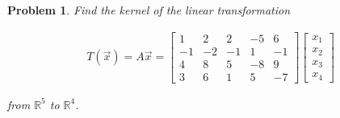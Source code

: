 \documentclass{article}
\newtheorem{problem}{Problem}
\begin{document}
\begin{problem}
Find the kernel of the linear transformation 

\begin{align*}
T(\vec{x}) = A\vec{x} =
\begin{bmatrix}
1 & 2 & 2 & -5 & 6 \\ 
-1 & -2 & -1 & 1 & -1 \\
4 & 8 & 5 & -8 & 9 \\ 
3 & 6 & 1 & 5 & -7 
\end{bmatrix} \begin{bmatrix} x_{1} \\ x_{2} \\ x_{3} \\ x_{4} \end{bmatrix}
\end{align*}

from $\mathbb{R}^5$ to $\mathbb{R}^4$.

\end{problem}
\end{document}
